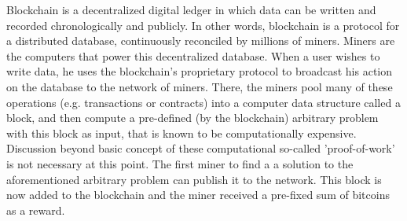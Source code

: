 Blockchain is a decentralized digital ledger in which data can be written and recorded chronologically and publicly.
In other words, blockchain is a protocol for a distributed database, continuously reconciled by millions of miners.
Miners are the computers that power this decentralized database.
When a user wishes to write data, he uses the blockchain's proprietary protocol to broadcast his action on the database
to the network of miners.
There, the miners pool many of these operations (e.g. transactions or contracts) into a computer data structure called a block,
and then compute a pre-defined (by the blockchain) arbitrary problem with this block as input,
that is known to be computationally expensive.
Discussion beyond basic concept of these computational so-called 'proof-of-work' is not necessary at this point.
The first miner to find a a solution to the aforementioned arbitrary problem can publish it to the network.
This block is now added to the blockchain and the miner received a pre-fixed sum of bitcoins as a reward.
